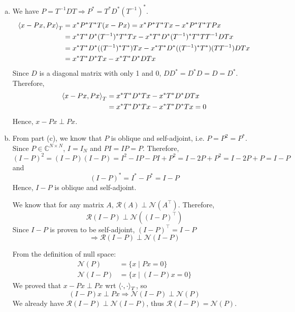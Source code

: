 \begin{enumerate}[(a)]
\item We have $P = T^{-1}DT \Rightarrow P^* = T^* D^* (T^{-1})^*$.
\begin{align*}
	\left\langle x-Px, Px \right\rangle_T 
	&= x^* P^* T^* T (x - Px) = x^* P^* T^* T x - x^* P^* T^* T P x \\
	&= x^* T^* D^* (T^{-1})^* T^* T x - x^* T^* D^* (T^{-1})^* T^* T T^{-1}DT x \\
	&= x^* T^* D^* ((T^{-1})^* T^*) T x - x^* T^* D^* ((T^{-1})^* T^*) (T T^{-1})DT x \\
	&= x^* T^* D^* T x - x^* T^* D^* DT x
\end{align*}
Since $D$ is a diagonal matrix with only 1 and 0, $D D^* = D^* D = D = D^*$. Therefore,
\begin{align*}
	\left\langle x-Px, Px \right\rangle_T 
	&= x^* T^* D^* T x - x^* T^* D^* DT x \\
	&= x^* T^* D^* T x - x^* T^* D^* T x = 0
\end{align*}
Hence, $x-Px \perp Px$.

\item From part (c), we know that $P$ is oblique and self-adjoint, i.e. $P = P^2 = P^*$. Since $P \in \mathbb{C}^{N \times N}$, $I = I_N$ and $PI = IP = P$. Therefore,
\[(I-P)^2 = (I-P)(I-P) = I^2 - IP - PI + P^2 = I - 2P + P^2 = I - 2P + P = I - P\]
and
\[(I-P)^* = I^* - P^* = I - P\]
Hence, $I-P$ is oblique and self-adjoint.

We know that for any matrix $A$, $\mathcal{R}(A) \perp \mathcal{N}(A^\top)$. Therefore,
\[\mathcal{R}(I-P) \perp \mathcal{N}((I-P)^\top)\]
Since $I-P$ is proven to be self-adjoint, $(I-P)^\top = I-P$
\[\Rightarrow \mathcal{R}(I-P) \perp \mathcal{N}(I-P)\]

From the definition of null space:
\begin{align*}
	\mathcal{N}(P) &= \{x \mid Px = 0\} \\
	\mathcal{N}(I-P) &= \{x \mid (I-P)x = 0\}
\end{align*}
We proved that $x-Px \perp Px$ wrt $\left\langle \cdot, \cdot \right\rangle_T$, so 
\[(I-P)x \perp Px \Rightarrow \mathcal{N}(I-P) \perp \mathcal{N}(P)\]
We already have $\mathcal{R}(I-P) \perp \mathcal{N}(I-P)$, thus $\mathcal{R}(I-P) = \mathcal{N}(P)$.

\end{enumerate}